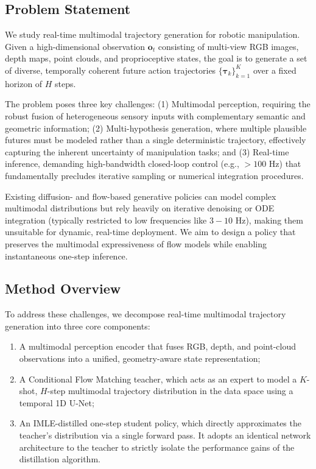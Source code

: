\subsection{Problem Statement}
We study real-time multimodal trajectory generation for robotic manipulation. Given a high-dimensional observation $\mathbf{o}_t$ consisting of multi-view RGB images, depth maps, point clouds, and proprioceptive states, the goal is to generate a set of diverse, temporally coherent future action trajectories $\{\boldsymbol{\tau}_k\}_{k=1}^K$ over a fixed horizon of $H$ steps.

The problem poses three key challenges: 
(1) Multimodal perception, requiring the robust fusion of heterogeneous sensory inputs with complementary semantic and geometric information; 
(2) Multi-hypothesis generation, where multiple plausible futures must be modeled rather than a single deterministic trajectory, effectively capturing the inherent uncertainty of manipulation tasks; and 
(3) Real-time inference, demanding high-bandwidth closed-loop control (e.g., $>100$ Hz) that fundamentally precludes iterative sampling or numerical integration procedures.

Existing diffusion- and flow-based generative policies can model complex multimodal distributions but rely heavily on iterative denoising or ODE integration (typically restricted to low frequencies like $3-10$ Hz), making them unsuitable for dynamic, real-time deployment. We aim to design a policy that preserves the multimodal expressiveness of flow models while enabling instantaneous one-step inference.

\subsection{Method Overview}
To address these challenges, we decompose real-time multimodal trajectory generation into three core components:
\begin{enumerate}
    \item A multimodal perception encoder that fuses RGB, depth, and point-cloud observations into a unified, geometry-aware state representation;
    \item A Conditional Flow Matching teacher, which acts as an expert to model a $K$-shot, $H$-step multimodal trajectory distribution in the data space using a temporal 1D U-Net;
    \item An IMLE-distilled one-step student policy, which directly approximates the teacher's distribution via a single forward pass. It adopts an identical network architecture to the teacher to strictly isolate the performance gains of the distillation algorithm.
\end{enumerate}


